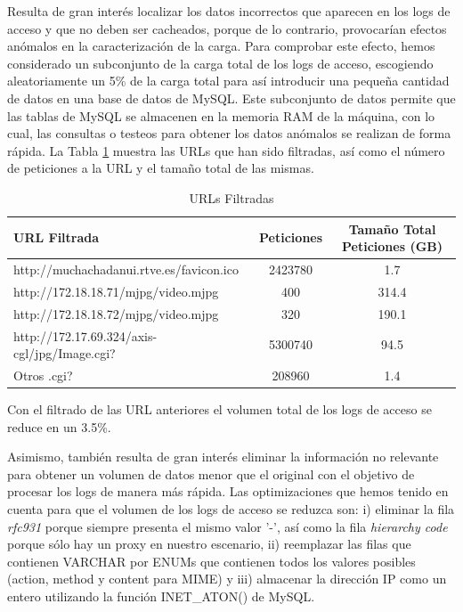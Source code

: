 \documentclass[twocolumn]{Jornadas}
\begin{document}
Resulta de gran interés localizar los datos incorrectos que aparecen en los logs de acceso y que no deben ser cacheados, porque de lo contrario, provocarían efectos anómalos en la caracterización de la carga. Para comprobar este efecto, hemos considerado un subconjunto de la carga total de los logs de acceso, escogiendo aleatoriamente un 5\% de la carga total para así introducir una pequeña cantidad de datos en una base de datos de MySQL. Este subconjunto de datos permite que las tablas de MySQL se almacenen en la memoria RAM de la máquina, con lo cual, las consultas o testeos para obtener los datos anómalos se realizan de forma rápida.
La Tabla \ref{table:url} muestra las URLs que han sido filtradas, así como el número de peticiones a la URL y el tamaño total de las mismas.

\begin{table}[ht!]
\centering
\renewcommand{\baselinestretch}{1.5}
\scriptsize
\begin{tabular}{|l||c|c|} \hline
URL Filtrada                                  & Peticiones & Tamaño Total Peticiones (GB) \\\hline\hline
http://muchachadanui.rtve.es/favicon.ico      & 2423780    & 1.7                          \\\hline  
http://172.18.18.71/mjpg/video.mjpg           & 400        & 314.4                        \\\hline 
http://172.18.18.72/mjpg/video.mjpg           & 320        & 190.1                        \\\hline 
http://172.17.69.324/axis-cgl/jpg/Image.cgi?  & 5300740    & 94.5                         \\\hline 
Otros .cgi?                                   & 208960     & 1.4                          \\\hline 
\end{tabular}
\caption{URLs Filtradas}
\label{table:url}
\end{table}


Con el filtrado de las URL anteriores el volumen total de los logs de acceso se reduce en un 3.5\%.

Asimismo, también resulta de gran interés eliminar la información no relevante para obtener un volumen de datos menor que el original con el objetivo de procesar los logs de manera más rápida. Las optimizaciones que hemos tenido en cuenta para que el volumen de los logs de acceso se reduzca son: i) eliminar la fila \emph{rfc931} porque siempre presenta el mismo valor '-', así como la fila \emph{hierarchy code} porque sólo hay un proxy en nuestro escenario, ii) reemplazar las filas que contienen VARCHAR por ENUMs que contienen todos los valores posibles (action, method y content para MIME) y iii) almacenar la dirección IP como un entero utilizando la función INET\_ATON() de MySQL.
\end{document}
